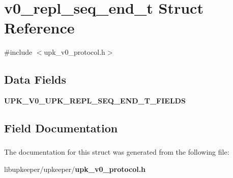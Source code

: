 \section{v0\_\-repl\_\-seq\_\-end\_\-t Struct Reference}
\label{structv0__repl__seq__end__t}


{\ttfamily \#include $<$upk\_\-v0\_\-protocol.h$>$}

\subsection*{Data Fields}
\begin{DoxyCompactItemize}
\item 
{\bf UPK\_\-V0\_\-UPK\_\-REPL\_\-SEQ\_\-END\_\-T\_\-FIELDS}
\end{DoxyCompactItemize}


\subsection{Field Documentation}
\subsubsection[{UPK\_\-V0\_\-UPK\_\-REPL\_\-SEQ\_\-END\_\-T\_\-FIELDS}]{}\label{structv0__repl__seq__end__t_aaf2fd0b71007615338b85df2c71a48aa}


The documentation for this struct was generated from the following file:\begin{DoxyCompactItemize}
\item 
libupkeeper/upkeeper/{\bf upk\_\-v0\_\-protocol.h}\end{DoxyCompactItemize}
